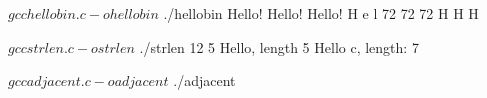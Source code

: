 \documentclass[12pt, oneside, landscape]{article}
\begin{document}


\begin{shell}
$ gcc hellobin.c -o hellobin
$ ./hellobin
Hello!
Hello!
Hello!
H e l
72 72 72
H H H
\end{shell}

\newpage



\begin{shell}
$ gcc strlen.c -o strlen
$ ./strlen
12
5
Hello, length 5
Hello c, length: 7
\end{shell}

\vspace{5em}




\begin{shell}
$ gcc adjacent.c -o adjacent
$ ./adjacent
\end{shell}
\end{document}
